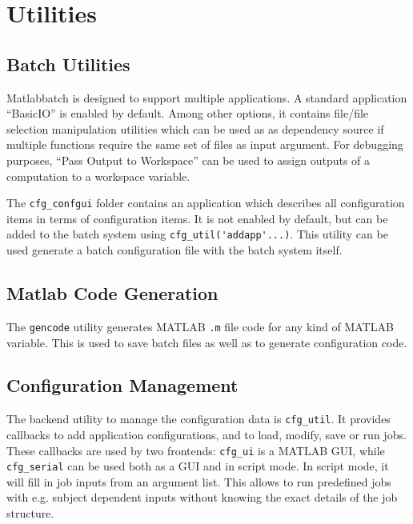 \section{Utilities}

\subsection{Batch Utilities}

Matlabbatch is designed to support multiple applications. A standard
application ``BasicIO'' is enabled by default. Among other options, it
contains file/file selection manipulation utilities which can be used as as
dependency source if multiple functions require the same set of files as input
argument. For debugging purposes, ``Pass Output to Workspace'' can be used to
assign outputs of a computation to a workspace variable.

The \verb|cfg_confgui| folder contains an application which describes all
configuration items in terms of configuration items. It is not enabled by
default, but can be added to the batch system using
\verb|cfg_util('addapp'...)|. This utility can be used generate a batch
configuration file with the batch system itself.

\subsection{Matlab Code Generation}

The \verb|gencode| utility generates MATLAB \verb|.m| file code for any kind
of MATLAB variable. This is used to save batch files as well as to generate
configuration code.

\subsection{Configuration Management}

The backend utility to manage the configuration data is \verb|cfg_util|. It
provides callbacks to add application configurations, and to load, modify,
save or run jobs. These callbacks are used by two frontends: \verb|cfg_ui| is
a MATLAB GUI, while \verb|cfg_serial| can be used both as a GUI and in script
mode. In script mode, it will fill in job inputs from an argument list. This
allows to run predefined jobs with e.g. subject dependent inputs without
knowing the exact details of the job structure.


